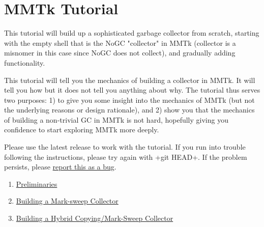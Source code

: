 \documentclass[a4paper,oneside]{book}
\begin{document}






\part{MMTk Tutorial}
\label{part:mmtktutorial}

This tutorial will build up a sophisticated garbage collector from scratch, starting with the empty shell that is the NoGC "collector" in MMTk (collector is a misnomer in this case since NoGC does not collect), and gradually adding functionality.

This tutorial will tell you the mechanics of building a collector in MMTk. It will tell you how but it does not tell you anything about why. The tutorial thus serves two purposes: 1) to give you some insight into the mechanics of MMTk (but not the underlying reasons or design rationale), and 2) show you that the mechanics of building a non-trivial GC in MMTk is not hard, hopefully giving you confidence to start exploring MMTk more deeply.

Please use the latest release to work with the tutorial. If you run into trouble following the instructions, please try again with \spverb+git HEAD+. If the problem persists, please \href{http://www.jikesrvm.org/ReportingBugs/}{report this as a bug}.

\begin{enumerate}
\item \hyperref[cha:preliminaries]{Preliminaries}
\item \hyperref[cha:buildingamarksweepcollector]{Building a Mark-sweep Collector}
\item \hyperref[cha:buildingahybridcollector]{Building a Hybrid Copying/Mark-Sweep Collector}
\end{enumerate}






\end{document}
